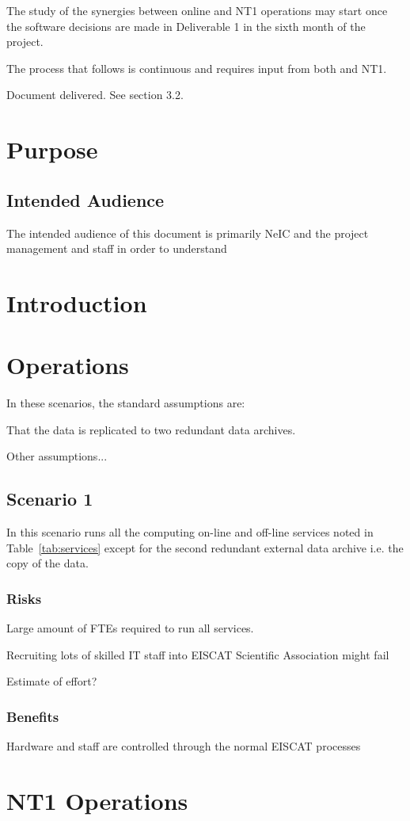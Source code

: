 \documentclass[12pt,a4paper]{article}
\begin{document}
The study of the synergies between \ED online and NT1 operations may start once the software decisions are made in Deliverable 1 in the sixth month of the project.

The process that follows is continuous and requires input from both \ED and NT1.

Document delivered. See section 3.2.

\section{Purpose}
\label{purpose}

\subsection{Intended Audience}

The intended audience of this document is primarily NeIC and the \ED project management and staff in order to understand 

\section{Introduction}
\label{intro}



\section{\ED Operations}

In these scenarios, the standard assumptions are:
\bitm
\item That the \ED data is replicated to two redundant data archives.
\item Other assumptions...
\eitm
\subsection{Scenario 1}

In this scenario \EC runs all the computing on-line and off-line services noted in Table~\ref{tab:services} except for the second redundant external data archive 
i.e. the copy of the \ED data.

\subsubsection{Risks}

\bitm
\item Large amount of FTEs required to run all services.
\item Recruiting lots of skilled IT staff into EISCAT Scientific Association might fail
\item Estimate of effort? 
\eitm

\subsubsection{Benefits}
\bitm
\item Hardware and staff are controlled through the normal EISCAT processes
\eitm

\section{NT1 Operations}


\newpage
{}

\end{document}
